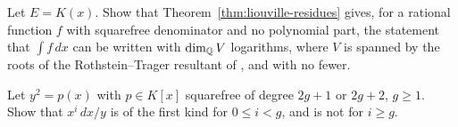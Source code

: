 \begin{exercise}
Let $E = K(x)$. Show that Theorem~\ref{thm:liouville-residues} gives, for a
rational function $f$ with squarefree denominator and no polynomial part, the
statement that $\int f\,dx$ can be written with $\dim_{\mathbb{Q}} V$ logarithms, where
$V$ is spanned by the roots of the Rothstein--Trager resultant of
, and with no fewer.
\end{exercise}

\begin{exercise}
Let $y^2 = p(x)$ with $p \in K[x]$ squarefree of degree $2g + 1$ or $2g + 2$,
$g \ge 1$. Show that $x^i\,dx/y$ is of the first kind for $0 \le i < g$, and
is not for $i \ge g$.
\end{exercise}
